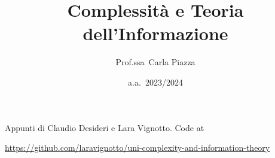 \documentclass[a4paper,11pt]{book}
\title{\fontfamily{cmss}\fontsize{50}{60}\selectfont \textbf{Complessità e Teoria dell'Informazione}}
\author{\Large \fontfamily{cmss}\selectfont Prof.ssa~Carla Piazza}
\date{\fontfamily{cmss}\selectfont a.a.~2023/2024}
\theoremstyle{definition}
\theoremstyle{definition}
\begin{document}
\BgThispage

\maketitle

\vfill

Appunti di Claudio Desideri e Lara Vignotto.
\vfill
\hfill Code at

\hfill \href{https://github.com/laravignotto/uni-complexity-and-information-theory}{https://github.com/laravignotto/uni-complexity-and-information-theory}
\tableofcontents

\newpage







\newpage
\renewcommand{\listtheoremname}{Lista di Teoremi}
\listoftheorems[ignoreall,show={theorem,
}]

\newpage
\renewcommand{\listtheoremname}{Lista di Definizioni}
\listoftheorems[ignoreall,show=definition]
\end{document}
